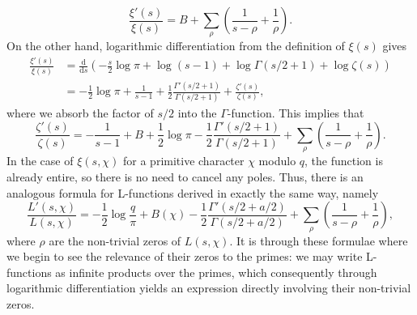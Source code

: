 \begin{equation}
    \frac{\xi'(s)}{\xi(s)} = B + \sum_{\rho} \left( \frac{1}{s-\rho} + \frac{1}{\rho} \right). \nonumber
\end{equation}
On the other hand, logarithmic differentiation from the definition of $\xi(s)$ gives
\begin{align}
    \frac{\xi'(s)}{\xi(s)} &= \frac{\mathrm{d}}{\mathrm{d}s} \left( - \frac{s}{2}\log \pi + \log (s-1) + \log \Gamma(s/2 + 1) + \log \zeta(s) \right) \nonumber \\
    &= -\frac12 \log \pi + \frac{1}{s-1} + \frac12 \frac{\Gamma'(s/2 + 1)}{\Gamma(s/2 + 1)} + \frac{\zeta'(s)}{\zeta(s)}, \nonumber
\end{align}
where we absorb the factor of $s/2$ into the $\Gamma$-function. This implies that
\begin{equation}
\label{ZetaPartialFraction}
    \frac{\zeta'(s)}{\zeta(s)} = -\frac{1}{s-1} + B + \frac12 \log \pi - \frac12 \frac{\Gamma'(s/2 + 1)}{\Gamma(s/2 + 1)} + \sum_{\rho} \left( \frac{1}{s-\rho} + \frac{1}{\rho} \right).
\end{equation}
In the case of $\xi(s, \chi)$ for a primitive character $\chi$ modulo $q$, the function is already entire, so there is no need to cancel any poles. Thus, there is an analogous formula for L-functions derived in exactly the same way, namely
\begin{equation}
\label{LPartialFraction}
    \frac{L'(s, \chi)}{L(s, \chi)} = -\frac12 \log \frac{q}{\pi} + B(\chi) - \frac12 \frac{\Gamma'(s/2 + a/2)}{\Gamma(s/2 + a/2)} + \sum_{\rho} \left( \frac{1}{s-\rho} + \frac{1}{\rho} \right), 
\end{equation}
where $\rho$ are the non-trivial zeros of $L(s, \chi)$. It is through these formulae where we begin to see the relevance of their zeros to the primes: we may write L-functions as infinite products over the primes, which consequently through logarithmic differentiation yields an expression directly involving their non-trivial zeros.